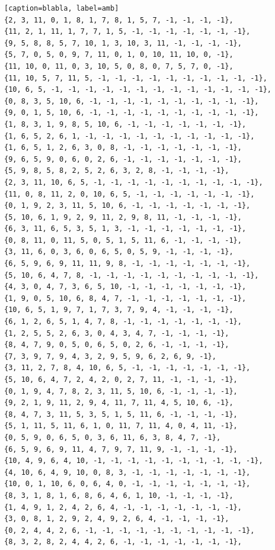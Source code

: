 \documentclass[12pt]{article}
\begin{document}
\begin{lstlisting}[frame=single][caption=blabla, label=amb]
{2, 3, 11, 0, 1, 8, 1, 7, 8, 1, 5, 7, -1, -1, -1, -1},
{11, 2, 1, 11, 1, 7, 7, 1, 5, -1, -1, -1, -1, -1, -1, -1},
{9, 5, 8, 8, 5, 7, 10, 1, 3, 10, 3, 11, -1, -1, -1, -1},
{5, 7, 0, 5, 0, 9, 7, 11, 0, 1, 0, 10, 11, 10, 0, -1},
{11, 10, 0, 11, 0, 3, 10, 5, 0, 8, 0, 7, 5, 7, 0, -1},
{11, 10, 5, 7, 11, 5, -1, -1, -1, -1, -1, -1, -1, -1, -1, -1},
{10, 6, 5, -1, -1, -1, -1, -1, -1, -1, -1, -1, -1, -1, -1, -1},
{0, 8, 3, 5, 10, 6, -1, -1, -1, -1, -1, -1, -1, -1, -1, -1},
{9, 0, 1, 5, 10, 6, -1, -1, -1, -1, -1, -1, -1, -1, -1, -1},
{1, 8, 3, 1, 9, 8, 5, 10, 6, -1, -1, -1, -1, -1, -1, -1},
{1, 6, 5, 2, 6, 1, -1, -1, -1, -1, -1, -1, -1, -1, -1, -1},
{1, 6, 5, 1, 2, 6, 3, 0, 8, -1, -1, -1, -1, -1, -1, -1},
{9, 6, 5, 9, 0, 6, 0, 2, 6, -1, -1, -1, -1, -1, -1, -1},
{5, 9, 8, 5, 8, 2, 5, 2, 6, 3, 2, 8, -1, -1, -1, -1},
{2, 3, 11, 10, 6, 5, -1, -1, -1, -1, -1, -1, -1, -1, -1, -1},
{11, 0, 8, 11, 2, 0, 10, 6, 5, -1, -1, -1, -1, -1, -1, -1},
{0, 1, 9, 2, 3, 11, 5, 10, 6, -1, -1, -1, -1, -1, -1, -1},
{5, 10, 6, 1, 9, 2, 9, 11, 2, 9, 8, 11, -1, -1, -1, -1},
{6, 3, 11, 6, 5, 3, 5, 1, 3, -1, -1, -1, -1, -1, -1, -1},
{0, 8, 11, 0, 11, 5, 0, 5, 1, 5, 11, 6, -1, -1, -1, -1},
{3, 11, 6, 0, 3, 6, 0, 6, 5, 0, 5, 9, -1, -1, -1, -1},
{6, 5, 9, 6, 9, 11, 11, 9, 8, -1, -1, -1, -1, -1, -1, -1},
{5, 10, 6, 4, 7, 8, -1, -1, -1, -1, -1, -1, -1, -1, -1, -1},
{4, 3, 0, 4, 7, 3, 6, 5, 10, -1, -1, -1, -1, -1, -1, -1},
{1, 9, 0, 5, 10, 6, 8, 4, 7, -1, -1, -1, -1, -1, -1, -1},
{10, 6, 5, 1, 9, 7, 1, 7, 3, 7, 9, 4, -1, -1, -1, -1},
{6, 1, 2, 6, 5, 1, 4, 7, 8, -1, -1, -1, -1, -1, -1, -1},
{1, 2, 5, 5, 2, 6, 3, 0, 4, 3, 4, 7, -1, -1, -1, -1},
{8, 4, 7, 9, 0, 5, 0, 6, 5, 0, 2, 6, -1, -1, -1, -1},
{7, 3, 9, 7, 9, 4, 3, 2, 9, 5, 9, 6, 2, 6, 9, -1},
{3, 11, 2, 7, 8, 4, 10, 6, 5, -1, -1, -1, -1, -1, -1, -1},
{5, 10, 6, 4, 7, 2, 4, 2, 0, 2, 7, 11, -1, -1, -1, -1},
{0, 1, 9, 4, 7, 8, 2, 3, 11, 5, 10, 6, -1, -1, -1, -1},
{9, 2, 1, 9, 11, 2, 9, 4, 11, 7, 11, 4, 5, 10, 6, -1},
{8, 4, 7, 3, 11, 5, 3, 5, 1, 5, 11, 6, -1, -1, -1, -1},
{5, 1, 11, 5, 11, 6, 1, 0, 11, 7, 11, 4, 0, 4, 11, -1},
{0, 5, 9, 0, 6, 5, 0, 3, 6, 11, 6, 3, 8, 4, 7, -1},
{6, 5, 9, 6, 9, 11, 4, 7, 9, 7, 11, 9, -1, -1, -1, -1},
{10, 4, 9, 6, 4, 10, -1, -1, -1, -1, -1, -1, -1, -1, -1, -1},
{4, 10, 6, 4, 9, 10, 0, 8, 3, -1, -1, -1, -1, -1, -1, -1},
{10, 0, 1, 10, 6, 0, 6, 4, 0, -1, -1, -1, -1, -1, -1, -1},
{8, 3, 1, 8, 1, 6, 8, 6, 4, 6, 1, 10, -1, -1, -1, -1},
{1, 4, 9, 1, 2, 4, 2, 6, 4, -1, -1, -1, -1, -1, -1, -1},
{3, 0, 8, 1, 2, 9, 2, 4, 9, 2, 6, 4, -1, -1, -1, -1},
{0, 2, 4, 4, 2, 6, -1, -1, -1, -1, -1, -1, -1, -1, -1, -1},
{8, 3, 2, 8, 2, 4, 4, 2, 6, -1, -1, -1, -1, -1, -1, -1},

\end{lstlisting}
\end{document}
